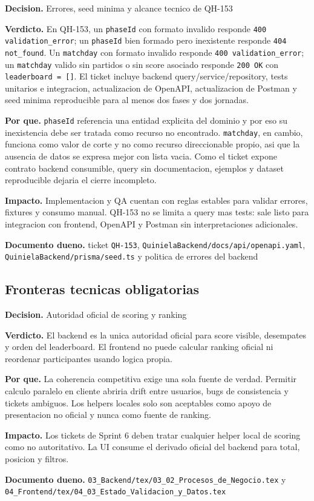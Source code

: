 \begin{docnote}
\textbf{Decision.} Errores, seed minima y alcance tecnico de QH-153

\textbf{Verdicto.} En QH-153, un \texttt{phaseId} con formato invalido responde \texttt{400 validation\_error}; un \texttt{phaseId} bien formado pero inexistente responde \texttt{404 not\_found}. Un \texttt{matchday} con formato invalido responde \texttt{400 validation\_error}; un \texttt{matchday} valido sin partidos o sin score asociado responde \texttt{200 OK} con \texttt{leaderboard = []}. El ticket incluye backend query/service/repository, tests unitarios e integracion, actualizacion de OpenAPI, actualizacion de Postman y seed minima reproducible para al menos dos fases y dos jornadas.

\textbf{Por que.} \texttt{phaseId} referencia una entidad explicita del dominio y por eso su inexistencia debe ser tratada como recurso no encontrado. \texttt{matchday}, en cambio, funciona como valor de corte y no como recurso direccionable propio, asi que la ausencia de datos se expresa mejor con lista vacia. Como el ticket expone contrato backend consumible, query sin documentacion, ejemplos y dataset reproducible dejaria el cierre incompleto.

\textbf{Impacto.} Implementacion y QA cuentan con reglas estables para validar errores, fixtures y consumo manual. QH-153 no se limita a query mas tests: sale listo para integracion con frontend, OpenAPI y Postman sin interpretaciones adicionales.

\textbf{Documento dueno.} ticket \texttt{QH-153}, \texttt{QuinielaBackend/docs/api/openapi.yaml}, \texttt{QuinielaBackend/prisma/seed.ts} y politica de errores del backend
\end{docnote}

\subsection{Fronteras tecnicas obligatorias}

\begin{docnote}
\textbf{Decision.} Autoridad oficial de scoring y ranking

\textbf{Verdicto.} El backend es la unica autoridad oficial para score visible, desempates y orden del leaderboard. El frontend no puede calcular ranking oficial ni reordenar participantes usando logica propia.

\textbf{Por que.} La coherencia competitiva exige una sola fuente de verdad. Permitir calculo paralelo en cliente abriria drift entre usuarios, bugs de consistencia y tickets ambiguos. Los helpers locales solo son aceptables como apoyo de presentacion no oficial y nunca como fuente de ranking.

\textbf{Impacto.} Los tickets de Sprint 6 deben tratar cualquier helper local de scoring como no autoritativo. La UI consume el derivado oficial del backend para total, posicion y filtros.

\textbf{Documento dueno.} \texttt{03\_Backend/tex/03\_02\_Procesos\_de\_Negocio.tex} y \texttt{04\_Frontend/tex/04\_03\_Estado\_Validacion\_y\_Datos.tex}
\end{docnote}

